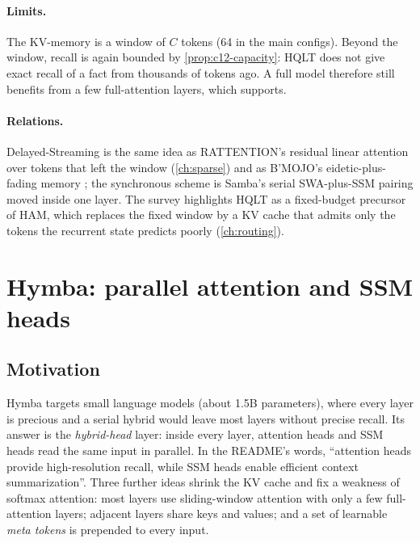 \paragraph{Limits.} The KV-memory is a window of $C$ tokens (64 in the main configs). Beyond the
window, recall is again bounded by \cref{prop:c12-capacity}: HQLT does not give exact recall of
a fact from thousands of tokens ago. A full model therefore still benefits from a few
full-attention layers, which  supports.

\paragraph{Relations.} Delayed-Streaming is the same idea as RATTENTION's residual linear
attention over tokens that left the window (\cref{ch:sparse}) and as B'MOJO's eidetic-plus-fading
memory \citep{c12-zancato2024bmojo}; the synchronous scheme is Samba's serial SWA-plus-SSM pairing
moved inside one layer. The survey highlights HQLT as a fixed-budget precursor of HAM, which
replaces the fixed window by a KV cache that admits only the tokens the recurrent state predicts
poorly (\cref{ch:routing}).
\section{Hymba: parallel attention and SSM heads}\label{sec:c12-hymba}

\subsection{Motivation}

Hymba \citep{dong2025hymba} targets small language models (about 1.5B parameters), where every
layer is precious and a serial hybrid would leave most layers without precise recall. Its
answer is the \emph{hybrid-head} layer: inside every layer, attention heads and SSM heads read
the same input in parallel. In the README's words, ``attention heads provide high-resolution
recall, while SSM heads enable efficient context summarization''. Three further ideas shrink the
KV cache and fix a weakness of softmax attention: most layers use sliding-window attention with
only a few full-attention layers; adjacent layers share keys and values; and a set of learnable
\emph{meta tokens} is prepended to every input.


